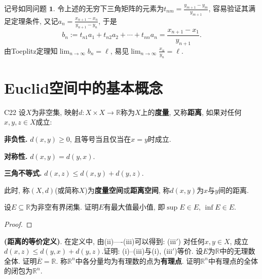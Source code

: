 \begin{quizb}
记号如同问题 \(\boldsymbol{1}\). 令上述的无穷下三角矩阵的元素为\(t_{nm}=\frac{y_{m+1}-y_{m}}{y_{m+1}}\), 容易验证其满足定理条件, 又记\(a_n=\frac{x_{n+1}-x_n}{y_{n+1}-y_n}\), 于是\[b_n:=t_{n1}a_1+t_{n2}a_2+\cdots+t_{nn}a_n=\frac{x_{n+1}-x_1}{y_{n+1}}.\]由Toeplitz定理知\(\lim_{n\rightarrow\infty}b_n=\ell\), 易见\(\lim_{n\rightarrow\infty}\frac{x_n}{y_n}=\ell.\)
\end{quizb}
\section{Euclid空间中的基本概念}
\begin{definition}{}{C22}
  设\(X\)为非空集, 映射\(d:X\times X\rightarrow\mathbb{R}\)称为\(X\)上的\textbf{度量}, 又称\textbf{距离}, 如果对任何\(x,y,z\in X\)成立:\begin{compactenum}[(i)]
    \item \textbf{非负性.} \(d(x,y)\geqslant 0\), 且等号当且仅当在\(x=y\)时成立.
    \item \textbf{对称性.} \(d(x,y)=d(y,x)\).
    \item \textbf{三角不等式.} \(d(x,z)\leqslant d(x,y)+d(y,z)\).
  \end{compactenum}
  此时, 称\((X,d)\)(或简称\(X\))为\textbf{度量空间}或\textbf{距离空间}, 称\(d(x,y)\)为\(x\)与\(y\)间的距离.
\end{definition}
\begin{quiza}
\woestar 设\(E\subseteq \mathbb{R}\)为非空有界闭集. 证明\(E\)有最大值最小值, 即\(\sup E\in E,\,\inf E\in E\).
\begin{proof}

\end{proof}
\woe \textbf{(距离的等价定义)}. 在定义中, 由(ii)----(iii)可以得到: (iii\('\)) 对任何\(x,y\in X\), 成立\(d(x,z)\leqslant d(y,x)+d(y,z).\)证明: (i)--(iii)与(i), (iii\('\))等价.
\woe 设\(E\)为\(\mathbb{R}\)中的无理数全体. 证明\(\overline{E}=\mathbb{R}\).
\woe 称\(\mathbb{R}^n\)中各分量均为有理数的点为\textbf{有理点}. 证明\(\mathbb{R}^n\)中有理点的全体的闭包为\(\mathbb{R}^n\).
\end{quiza}
